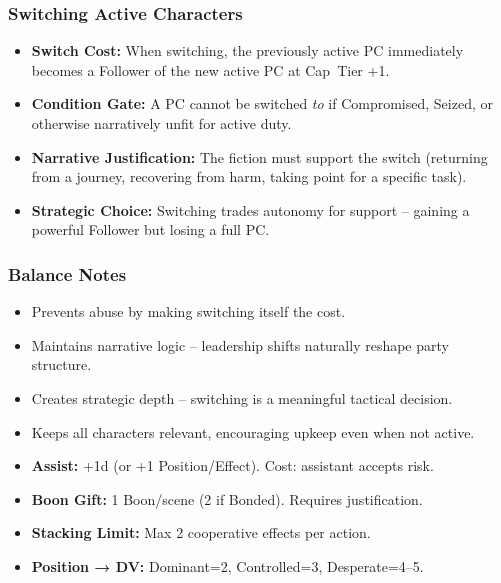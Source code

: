 \subsubsection*{Switching Active Characters}
\label{sec:switching-active-characters}
\begin{itemize}
  \item \textbf{Switch Cost:} When switching, the previously active PC immediately becomes a Follower of the new active PC at Cap~Tier +1.
  \item \textbf{Condition Gate:} A PC cannot be switched \emph{to} if Compromised, Seized, or otherwise narratively unfit for active duty.
  \item \textbf{Narrative Justification:} The fiction must support the switch (returning from a journey, recovering from harm, taking point for a specific task).
  \item \textbf{Strategic Choice:} Switching trades autonomy for support -- gaining a powerful Follower but losing a full PC.
\end{itemize}

\subsubsection*{Balance Notes}
\begin{itemize}
  \item Prevents abuse by making switching itself the cost.
  \item Maintains narrative logic -- leadership shifts naturally reshape party structure.
  \item Creates strategic depth -- switching is a meaningful tactical decision.
  \item Keeps all characters relevant, encouraging upkeep even when not active.
\end{itemize}

\begin{tcolorbox}[title=Coordination Quick Reference, colback=gray!5, colframe=black]
\begin{itemize}
  \item \textbf{Assist:} +1d (or +1 Position/Effect). Cost: assistant accepts risk.
  \item \textbf{Boon Gift:} 1 Boon/scene (2 if Bonded). Requires justification.
  \item \textbf{Stacking Limit:} Max 2 cooperative effects per action.
  \item \textbf{Position → DV:} Dominant=2, Controlled=3, Desperate=4--5.
\end{itemize}
\end{tcolorbox}